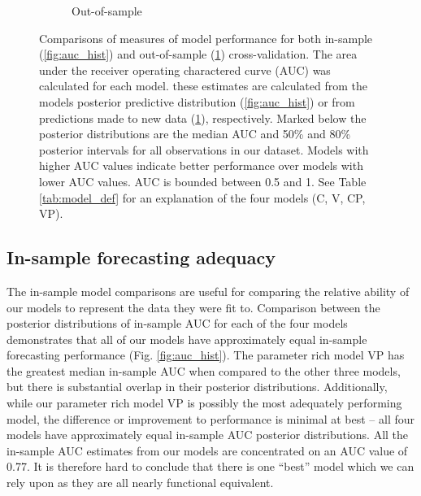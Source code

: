 \documentclass[12pt,letterpaper]{article}
\begin{document}
\begin{refsection}
\begin{figure}[ht]
\begin{subfigure}[ht]{0.45\textwidth}
  \caption{Out-of-sample}
  \label{fig:fold_auc}
 \end{subfigure}
 \caption{Comparisons of measures of model performance for both in-sample (\ref{fig:auc_hist}) and out-of-sample (\ref{fig:fold_auc}) cross-validation. The area under the receiver operating charactered curve (AUC) was calculated for each model. these estimates are calculated from the models posterior predictive distribution (\ref{fig:auc_hist}) or from predictions made to new data (\ref{fig:fold_auc}), respectively. Marked below the posterior distributions are the median AUC and 50\% and 80\% posterior intervals for all observations in our dataset. Models with higher AUC values indicate better performance over models with lower AUC values. AUC is bounded between 0.5 and 1. See Table \ref{tab:model_def} for an explanation of the four models (C, V, CP, VP).}
 \label{fig:auc_compare}
\end{figure}

\subsection{In-sample forecasting adequacy}

The in-sample model comparisons are useful for comparing the relative ability of our models to represent the data they were fit to. Comparison between the posterior distributions of in-sample AUC for each of the four models demonstrates that all of our models have approximately equal in-sample forecasting performance (Fig. \ref{fig:auc_hist}). The parameter rich model VP has the greatest median in-sample AUC when compared to the other three models, but there is substantial overlap in their posterior distributions. Additionally, while our parameter rich model VP is possibly the most adequately performing model, the difference or improvement to performance is minimal at best -- all four models have approximately equal in-sample AUC posterior distributions. All the in-sample AUC estimates from our models are concentrated on an AUC value of 0.77. It is therefore hard to conclude that there is one ``best'' model which we can rely upon as they are all nearly functional equivalent. 




\end{refsection}
\end{document}
